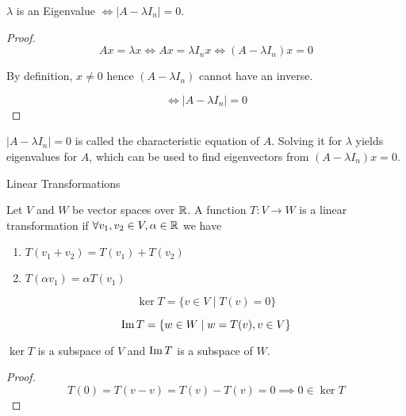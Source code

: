 \documentclass[a4paper,10pt]{article}
\begin{document}
\begin{lemma}
	$\lambda$ is an Eigenvalue $\iff |A - \lambda I_n| = 0$.
\end{lemma}

\begin{proof}
	\[ Ax = \lambda x \iff Ax = \lambda I_n x \iff (A - \lambda I_n)x = 0 \]

	By definition, $x \neq 0$ hence $(A - \lambda I_n)$ cannot have an inverse.

	\[ \iff |A - \lambda I_n| = 0 \]
\end{proof}

\begin{defn}
	$|A - \lambda I_n| = 0$ is called the characteristic equation of
	$A$. Solving it for $\lambda$ yields eigenvalues for $A$, which
	can be used to find eigenvectors from $(A - \lambda I_n)x = 0$.
\end{defn}

Linear Transformations

\begin{defn}
	Let $V$ and $W$ be vector spaces over $\mathbb{R}$. A function $T:V \to
	W$ is a linear transformation if $\forall v_1, v_2 \in V, \alpha
	\in \mathbb{R}$ we have
	\begin{enumerate}
		\item
			$T(v_1 + v_2) = T(v_1) + T(v_2)$
		\item
			$T(\alpha v_1) = \alpha T(v_1)$
	\end{enumerate}
\end{defn}

\begin{defn}[Kernel]
	\[ \ker T = \{ v \in V \mid T(v) = 0 \} \]
\end{defn}

\begin{defn}
	\[ \operatorname{Im} T = \{ w \in W \mid w = T(v), v \in V \} \]
\end{defn}

\begin{prop}
	$\ker T$ is a subspace of $V$ and $\operatorname{Im} T$ is a subspace of $W$.
\end{prop}

\begin{proof}
	\[ T(0) = T(v-v) = T(v) - T(v) = 0 \implies 0 \in \ker T \]

\end{proof}
\end{document}
